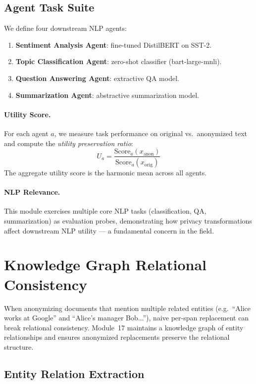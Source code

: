 \documentclass[11pt, a4paper]{article}
\begin{document}
\subsection{Agent Task Suite}

We define four downstream NLP agents:
\begin{enumerate}
  \item \textbf{Sentiment Analysis Agent}: fine-tuned DistilBERT on SST-2.
  \item \textbf{Topic Classification Agent}: zero-shot classifier (bart-large-mnli).
  \item \textbf{Question Answering Agent}: extractive QA model.
  \item \textbf{Summarization Agent}: abstractive summarization model.
\end{enumerate}

\paragraph{Utility Score.}
For each agent $a$, we measure task performance on original vs.\ anonymized text and compute the \emph{utility preservation ratio}:
\[
  U_a = \frac{\text{Score}_a(x_{\text{anon}})}{\text{Score}_a(x_{\text{orig}})}
\]
The aggregate utility score is the harmonic mean across all agents.

\paragraph{NLP Relevance.}
This module exercises multiple core NLP tasks (classification, QA, summarization) as evaluation probes, demonstrating how privacy transformations affect downstream NLP utility --- a fundamental concern in the field.


\section{Knowledge Graph Relational Consistency}
\label{sec:kg_consistency}

When anonymizing documents that mention multiple related entities (e.g.\ ``Alice works at Google'' and ``Alice's manager Bob...''), naive per-span replacement can break relational consistency.  Module~17 maintains a knowledge graph of entity relationships and ensures anonymized replacements preserve the relational structure.

\subsection{Entity Relation Extraction}
\end{document}
